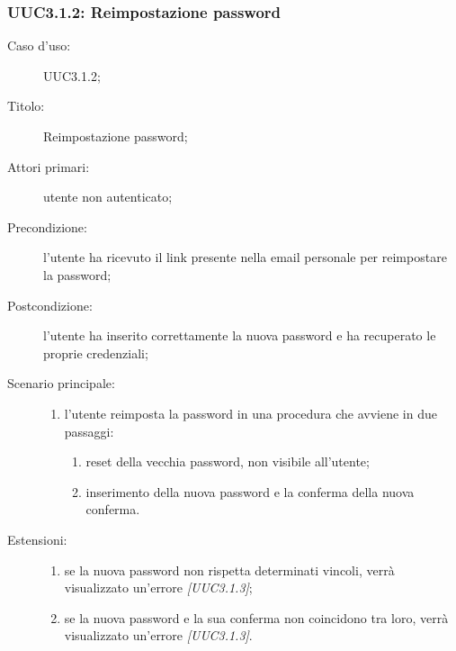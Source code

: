 \documentclass[../../../analisi-dei-requisiti.tex]{subfiles}
\begin{document}
\subsubsection{UUC3.1.2: Reimpostazione password}%
\label{subs:UUC3.1.2}
\begin{description}
  \item[Caso d’uso:] UUC3.1.2;
  \item[Titolo:] Reimpostazione password;
  \item[Attori primari:] utente non autenticato;
  \item[Precondizione:] l'utente ha ricevuto il link presente nella email personale per reimpostare la password;
  \item[Postcondizione:] l'utente ha inserito correttamente la nuova password e ha recuperato le proprie credenziali;
  \item[Scenario principale:]
        \begin{enumerate}
          \item l'utente reimposta la password in una procedura che avviene in due passaggi:
                \begin{enumerate}
                  \item reset della vecchia password, non visibile all'utente;
                  \item inserimento della nuova password e la conferma della nuova conferma.
                \end{enumerate}
        \end{enumerate}
  \item[Estensioni:]
        \begin{enumerate}
          \item se la nuova password non rispetta determinati vincoli, verrà visualizzato un'errore \emph{[UUC3.1.3]};
          \item se la nuova password e la sua conferma non coincidono tra loro, verrà visualizzato un'errore \emph{[UUC3.1.3]}.
        \end{enumerate}
\end{description}
\end{document}
